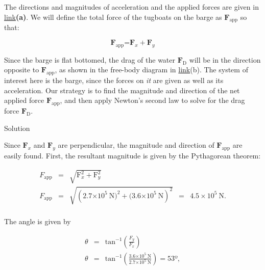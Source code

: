 \documentclass[
]{book}
\newenvironment{tinysection}{}{}
\begin{document}
The directions and magnitudes of acceleration and the applied forces are
given in \protect\hyperlink{import-auto-id1221020}{link}\textbf{(a)}.
We will define the total force of the tugboats on the barge as
\(\textbf{F}_{\text{app}}{}\) so that:

\leavevmode\hypertarget{eip-id1203757}{}%
\[\textbf{F}_{\text{app}}\text{=}\textbf{F}_{\mathit{x}} + \textbf{F}_{\mathit{y}}\]

Since the barge is flat bottomed, the drag of the water
\(\textbf{F}_{\text{D}}{}\) will be in the direction opposite to
\(\textbf{F}_{\text{app}}{}\), as shown in the free-body diagram in
\protect\hyperlink{import-auto-id1221020}{link}(b). The system of
interest here is the barge, since the forces on
\emph{it} are given as well as its
acceleration. Our strategy is to find the magnitude and direction of the
net applied force \(\textbf{F}_{\text{app}}{}\), and then apply Newton's
second law to solve for the drag force \(\textbf{F}_{\text{D}}{}\).

\begin{tinysection}

{Solution}

\end{tinysection}

Since \(\textbf{F}_{x}{}\)\emph{} and
\(\textbf{F}_{y}{}\)\emph{} are perpendicular,
the magnitude and direction of \(\textbf{F}_{\text{app}}{}\) are easily
found. First, the resultant magnitude is given by the Pythagorean
theorem:

\leavevmode\hypertarget{eip-id2112578}{}%
\[\begin{array}{lllll}
F_{\text{app}} & = & \sqrt{\text{F}_{x}^{2} + \text{F}_{y}^{2}} & & \\
F_{\text{app}} & = & \sqrt{(2.7{\times \text{10}^{5}}\ \text{N}{)^{2} + (}3.6{\times \text{10}^{5}}\ \text{N})^{2}} & = & {{4.5 \times \text{10}^{5}}\ \text{N.}} \\
\end{array}{}\]

The angle is given by

\leavevmode\hypertarget{eip-id3026466}{}%
\[\begin{array}{lll}
\theta & = & {\text{tan}^{- 1}\left( \frac{F_{y}}{F_{x}} \right)} \\
\theta & = & {\text{tan}^{- 1}{\left( \frac{3.6{\times \text{10}^{5}}\ \text{N}}{2.7{\times \text{10}^{5}}\ \text{N}} \right) = \text{53º}},} \\
\end{array}{}\]
\end{document}
